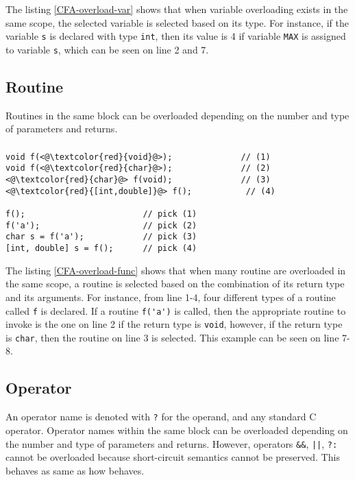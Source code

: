 The listing \ref{CFA-overload-var} shows that when variable overloading exists
in the same scope, the selected variable is selected based on its type. For
instance, if the variable \verb|s| is declared with type \verb|int|, then its
value is 4 if variable \verb|MAX| is assigned to variable \verb|s|, which can
be seen on line 2 and 7.

\subsection{Routine}
Routines in the same block can be overloaded depending on the number and type of
parameters and returns.


\begin{frame}
\frametitle{}
\begin{lstlisting}[caption={Overloading routines in \CFA},
label={CFA-overload-func}]
void f(<@\textcolor{red}{void}@>);              // (1)
void f(<@\textcolor{red}{char}@>);              // (2)
<@\textcolor{red}{char}@> f(void);              // (3)
<@\textcolor{red}{[int,double]}@> f();           // (4)

f();                        // pick (1)
f('a');                     // pick (2)
char s = f('a');            // pick (3)
[int, double] s = f();      // pick (4)
\end{lstlisting}
\end{frame}

The listing \ref{CFA-overload-func} shows that when many routine are overloaded in
the same scope, a routine is selected based on the combination of its return type and its
arguments. For instance, from line 1-4, four different types of a routine called
\verb|f| is declared. If a routine \verb|f('a')| is called, then the appropriate
routine to invoke is the one on line 2 if the return type is \verb|void|, however, if
the return type is \verb|char|, then the routine on line 3 is selected. This
example can be seen on line 7-8.

\subsection{Operator}
An operator name is denoted with \verb|?| for the operand, and any standard C
operator. Operator names within the same block can be overloaded depending on
the number and type of parameters and returns. However, operators \verb|&&|,
\verb-||-, \verb|?:| cannot be overloaded because short-circuit semantics
cannot be preserved. This behaves as same as how \CCS behaves.


